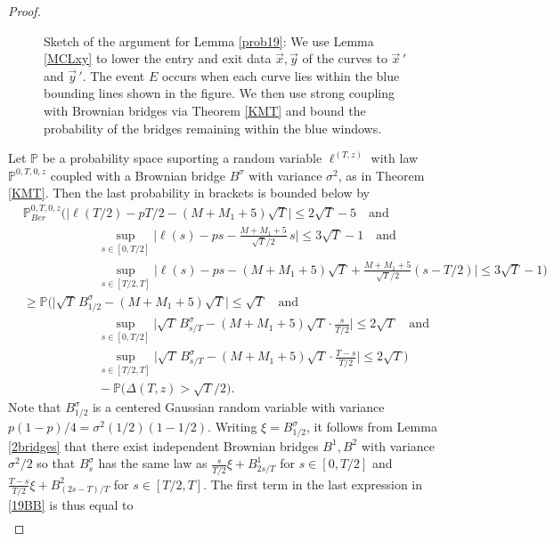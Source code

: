 \begin{proof}
\begin{figure}
	\caption{Sketch of the argument for Lemma \ref{prob19}: We use Lemma \ref{MCLxy} to lower the entry and exit data $\vec{x},\vec{y}$ of the curves to $\vec x\,'$ and $\vec y\,'$. The event $E$ occurs when each curve lies within the blue bounding lines shown in the figure. We then use strong coupling with Brownian bridges via Theorem \ref{KMT} and bound the probability of the bridges remaining within the blue windows.}
\end{figure}
	Let $\mathbb{P}$ be a probability space suporting a random variable $\ell^{(T,z)}$ with law $\mathbb{P}^{0,T,0,z}$ coupled with a Brownian bridge $B^\sigma$ with variance $\sigma^2$, as in Theorem \ref{KMT}. Then the last probability in brackets is bounded below by
	\begin{equation}\label{19BB}
	\begin{split}
	& \mathbb{P}^{0,T,0,z}_{Ber}\Big(\big|\ell(T/2)-pT/2-(M+M_1+5)\sqrt{T}\big|\leq 2\sqrt{T} - 5\quad\mathrm{and}\\
	&\qquad\qquad\qquad \sup_{s\in[0,T/2]}\Big|\ell(s)-ps-\frac{M+M_1+5}{\sqrt{T}/2}\,s\Big| \leq 3\sqrt{T} - 1 \quad\mathrm{and}\\
	&\qquad\qquad\qquad \sup_{s\in[T/2,T]}\Big|\ell(s)-ps-(M+M_1+5)\sqrt{T}+\frac{M+M_1+5}{\sqrt{T}/2}(s-T/2)\Big| \leq 3\sqrt{T} - 1 \Big)\\
	&\geq \mathbb{P}\Big(\big|\sqrt{T}\,B^\sigma_{1/2} - (M+M_1+5)\sqrt{T}\big|\leq \sqrt{T} \quad\mathrm{and}\\
	&\qquad\qquad\qquad\sup_{s\in[0,T/2]}\Big|\sqrt{T}\,B^\sigma_{s/T}-(M+M_1+5)\sqrt{T}\cdot\frac{s}{T/2}\Big| \leq 2\sqrt{T}\quad\mathrm{and}\\
	&\qquad\qquad\qquad \sup_{s\in[T/2,T]}\Big|\sqrt{T}\,B^\sigma_{s/T}-(M+M_1+5)\sqrt{T}\cdot\frac{T-s}{T/2}\Big| \leq 2\sqrt{T} \Big)\\
	&\qquad\qquad\qquad -  \mathbb{P}\Big(\Delta(T,z) > \sqrt{T}/2\Big).
	\end{split}
	\end{equation}
	Note that $B^\sigma_{1/2}$ is a centered Gaussian random variable with variance $p(1-p)/4 = \sigma^2(1/2)(1-1/2)$. Writing $\xi = B^\sigma_{1/2}$, it follows from Lemma \ref{2bridges} that there exist independent Brownian bridges $B^1,B^2$ with variance $\sigma^2/2$ so that $B^\sigma_s$ has the same law as $\frac{s}{T/2}\xi + B^1_{2s/T}$ for $s\in[0,T/2]$ and $\frac{T-s}{T/2}\xi + B^2_{(2s-T)/T}$ for $s\in[T/2,T]$. The first term in the last expression in \eqref{19BB} is thus equal to
	\begin{align*}

\end{align*}
\end{proof}
